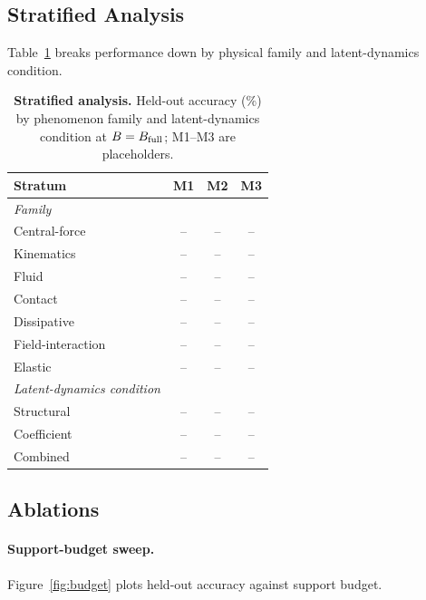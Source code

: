 \subsection{Stratified Analysis}

Table~\ref{tab:stratified} breaks performance down by physical family and latent-dynamics condition. 

\begin{table}[t]
  \centering
  \caption{\textbf{Stratified analysis.} Held-out accuracy (\%) by phenomenon family and latent-dynamics condition at $B=B_{\rm full}$; M1--M3 are placeholders. }
  \label{tab:stratified}
  \footnotesize
  \setlength{\tabcolsep}{4pt}
  \begin{tabular}{lccc}
    \toprule
    Stratum & M1 & M2 & M3 \\
    \midrule
    \emph{Family} \\
    \quad Central-force  & -- & -- & -- \\
    \quad Kinematics     & -- & -- & -- \\
    \quad Fluid          & -- & -- & -- \\
    \quad Contact        & -- & -- & -- \\
    \quad Dissipative    & -- & -- & -- \\
    \quad Field-interaction & -- & -- & -- \\
    \quad Elastic        & -- & -- & -- \\
    \midrule
    \emph{Latent-dynamics condition} \\
    \quad Structural     & -- & -- & -- \\
    \quad Coefficient    & -- & -- & -- \\
    \quad Combined       & -- & -- & -- \\
    \bottomrule
  \end{tabular}
\end{table}

\subsection{Ablations}

\paragraph{Support-budget sweep.} Figure~\ref{fig:budget} plots held-out accuracy against support budget. 

